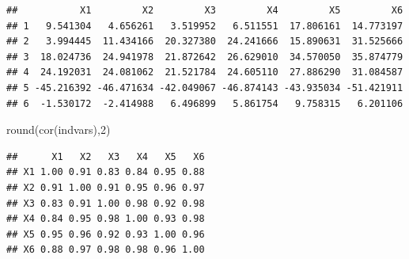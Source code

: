 \documentclass[
]{book}
\newenvironment{Shaded}{\begin{snugshade}}{\end{snugshade}}
\newcommand{\AttributeTok}[1]{\textcolor[rgb]{0.77,0.63,0.00}{#1}}
\newcommand{\DecValTok}[1]{\textcolor[rgb]{0.00,0.00,0.81}{#1}}
\newcommand{\FloatTok}[1]{\textcolor[rgb]{0.00,0.00,0.81}{#1}}
\newcommand{\FunctionTok}[1]{\textcolor[rgb]{0.00,0.00,0.00}{#1}}
\newcommand{\NormalTok}[1]{#1}
\newcommand{\OtherTok}[1]{\textcolor[rgb]{0.56,0.35,0.01}{#1}}
\newcommand{\SpecialCharTok}[1]{\textcolor[rgb]{0.00,0.00,0.00}{#1}}
\begin{document}
\begin{verbatim}
##           X1         X2         X3         X4         X5         X6
## 1   9.541304   4.656261   3.519952   6.511551  17.806161  14.773197
## 2   3.994445  11.434166  20.327380  24.241666  15.890631  31.525666
## 3  18.024736  24.941978  21.872642  26.629010  34.570050  35.874779
## 4  24.192031  24.081062  21.521784  24.605110  27.886290  31.084587
## 5 -45.216392 -46.471634 -42.049067 -46.874143 -43.935034 -51.421911
## 6  -1.530172  -2.414988   6.496899   5.861754   9.758315   6.201106
\end{verbatim}

\begin{Shaded}
\begin{Highlighting}[]
\FunctionTok{round}\NormalTok{(}\FunctionTok{cor}\NormalTok{(indvars),}\DecValTok{2}\NormalTok{)}
\end{Highlighting}
\end{Shaded}

\begin{verbatim}
##      X1   X2   X3   X4   X5   X6
## X1 1.00 0.91 0.83 0.84 0.95 0.88
## X2 0.91 1.00 0.91 0.95 0.96 0.97
## X3 0.83 0.91 1.00 0.98 0.92 0.98
## X4 0.84 0.95 0.98 1.00 0.93 0.98
## X5 0.95 0.96 0.92 0.93 1.00 0.96
## X6 0.88 0.97 0.98 0.98 0.96 1.00
\end{verbatim}

\begin{Shaded}
\end{Shaded}
\end{document}

